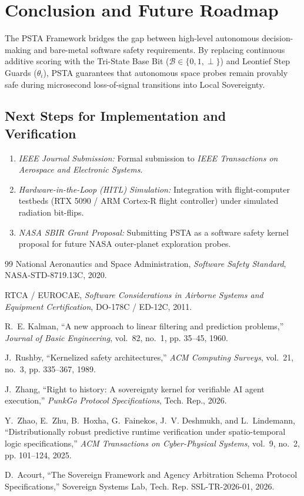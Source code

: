 \documentclass[journal]{IEEEtran}
\begin{document}
\section{Conclusion and Future Roadmap}

The PSTA Framework bridges the gap between high-level autonomous decision-making and bare-metal software safety requirements. By replacing continuous additive scoring with the Tri-State Base Bit ($\mathcal{B} \in \{0, 1, \perp\}$) and Leontief Step Guards ($\theta_i$), PSTA guarantees that autonomous space probes remain provably safe during microsecond loss-of-signal transitions into Local Sovereignty.

\subsection{Next Steps for Implementation and Verification}
\begin{enumerate}
    \item \emph{IEEE Journal Submission:} Formal submission to \emph{IEEE Transactions on Aerospace and Electronic Systems}.
    \item \emph{Hardware-in-the-Loop (HITL) Simulation:} Integration with flight-computer testbeds (RTX 5090 / ARM Cortex-R flight controller) under simulated radiation bit-flips.
    \item \emph{NASA SBIR Grant Proposal:} Submitting PSTA as a software safety kernel proposal for future NASA outer-planet exploration probes.
\end{enumerate}

\begin{thebibliography}{99}
National Aeronautics and Space Administration, \emph{Software Safety Standard}, NASA-STD-8719.13C, 2020.

RTCA / EUROCAE, \emph{Software Considerations in Airborne Systems and Equipment Certification}, DO-178C / ED-12C, 2011.

R.~E. Kalman, ``A new approach to linear filtering and prediction problems,'' \emph{Journal of Basic Engineering}, vol.~82, no.~1, pp. 35--45, 1960.

J.~Rushby, ``Kernelized safety architectures,'' \emph{ACM Computing Surveys}, vol.~21, no.~3, pp. 335--367, 1989.

J.~Zhang, ``Right to history: A sovereignty kernel for verifiable AI agent execution,'' \emph{PunkGo Protocol Specifications}, Tech. Rep., 2026.

Y.~Zhao, E.~Zhu, B.~Hoxha, G.~Fainekos, J.~V. Deshmukh, and L.~Lindemann, ``Distributionally robust predictive runtime verification under spatio-temporal logic specifications,'' \emph{ACM Transactions on Cyber-Physical Systems}, vol.~9, no.~2, pp. 101--124, 2025.

D.~Acourt, ``The Sovereign Framework and Agency Arbitration Schema Protocol Specifications,'' Sovereign Systems Lab, Tech. Rep. SSL-TR-2026-01, 2026.
\end{thebibliography}
\end{document}
